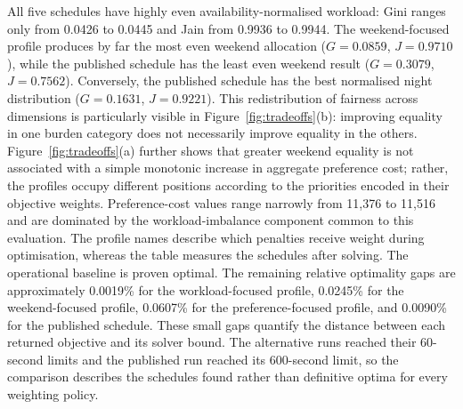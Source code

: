 \documentclass[11pt,a4paper]{article}
\begin{document}
All five schedules have highly even availability-normalised workload: Gini ranges only from 0.0426 to 0.0445 and Jain from 0.9936 to 0.9944. The weekend-focused profile produces by far the most even weekend allocation ($G=0.0859$, $J=0.9710$), while the published schedule has the least even weekend result ($G=0.3079$, $J=0.7562$). Conversely, the published schedule has the best normalised night distribution ($G=0.1631$, $J=0.9221$). This redistribution of fairness across dimensions is particularly visible in Figure~\ref{fig:tradeoffs}(b): improving equality in one burden category does not necessarily improve equality in the others. Figure~\ref{fig:tradeoffs}(a) further shows that greater weekend equality is not associated with a simple monotonic increase in aggregate preference cost; rather, the profiles occupy different positions according to the priorities encoded in their objective weights. Preference-cost values range narrowly from 11,376 to 11,516 and are dominated by the workload-imbalance component common to this evaluation. The profile names describe which penalties receive weight during optimisation, whereas the table measures the schedules after solving. The operational baseline is proven optimal. The remaining relative optimality gaps are approximately 0.0019\% for the workload-focused profile, 0.0245\% for the weekend-focused profile, 0.0607\% for the preference-focused profile, and 0.0090\% for the published schedule. These small gaps quantify the distance between each returned objective and its solver bound. The alternative runs reached their 60-second limits and the published run reached its 600-second limit, so the comparison describes the schedules found rather than definitive optima for every weighting policy.

\begin{table}[H]
\centering
\caption{Comparison of objective profiles. ``Gap'' is the relative difference between the returned objective and the solver's best bound; 0\% indicates a solver-certified optimum.}
\label{tab:profiles}
\small
{}
\end{table}
\end{document}

